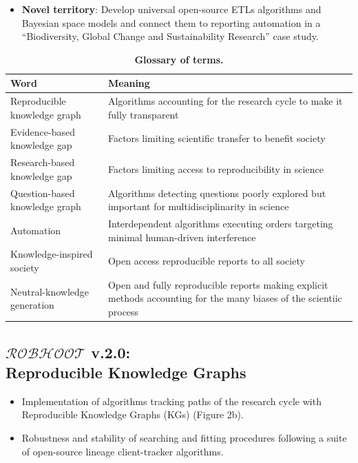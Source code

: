 \documentclass[10pt, a4paper, twocolumn]{article} %
\begin{document}
    \begin{itemize}
    \item {\bf Novel territory}: Develop universal open-source ETLs
      algorithms and Bayesian space models and connect them to
      reporting automation in a ``Biodiversity, Global Change and
      Sustainability Research'' case study.
   \end{itemize}

\begin{table}[ht]
\begin{tabular}{ p{5.5cm} | p{11cm}}
  \hline \hline
  \textbf{Word} &\textbf{Meaning}\\  \hline
  Reproducible knowledge graph & Algorithms accounting for the research cycle to make it fully transparent\\ \hline
  Evidence-based knowledge gap & Factors limiting scientific transfer to benefit society\\ \hline
  Research-based knowledge gap & Factors limiting access to reproducibility in science\\ \hline
  Question-based knowledge graph & Algorithms detecting questions poorly explored but important for multidisciplinarity in science\\ \hline
  Automation & Interdependent algorithms executing orders targeting minimal human-driven interference\\ \hline
  Knowledge-inspired society & Open access reproducible reports to all society \\ \hline
  Neutral-knowledge generation & Open and fully reproducible reports making explicit methods accounting for the many biases of the scientiic process\\ \hline

  \bottomrule
\end{tabular}
\caption{{\bf Glossary of terms.}}
\end{table}

   
  \subsection{{\bf $\mathcal{ROBHOOT}$ v.2.0}: \\ Reproducible Knowledge Graphs}
  \begin{itemize}
  \item Implementation of algorithms tracking paths of the research
    cycle with Reproducible Knowledge Graphs (KGs) (Figure 2b).
  \item Robustness and stability of searching and fitting procedures
    following a suite of open-source lineage client-tracker
    algorithms.
  \end{itemize}
\end{document}
